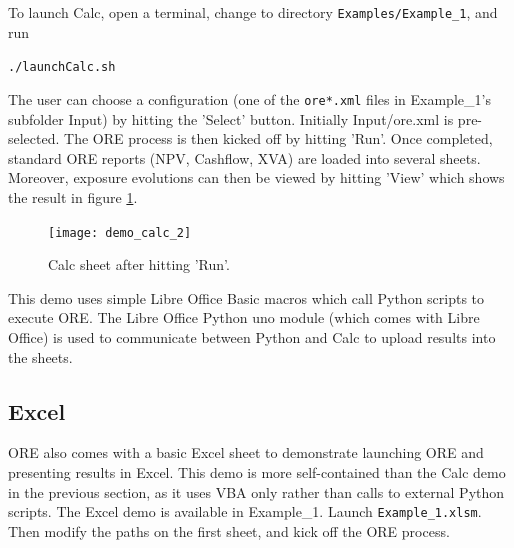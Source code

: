 \documentclass[12pt, a4paper]{article}
\begin{document}
To launch Calc, open a terminal, change to directory {\tt Examples/Example\_1}, and run

\medskip
{\centerline{\tt ./launchCalc.sh} }
\medskip

The user can choose a configuration (one of the {\tt ore*.xml} files in Example\_1's subfolder Input) by hitting the
'Select' button. Initially Input/ore.xml is pre-selected. The ORE process is then kicked off by hitting 'Run'. Once
completed, standard ORE reports (NPV, Cashflow, XVA) are loaded into several sheets. Moreover, exposure evolutions can
then be viewed by hitting 'View' which shows the result in figure \ref{fig_16}.  \\
\begin{figure}[h]
\begin{center}
\texttt{[image: demo\_calc\_2]}
\end{center}
\caption{Calc sheet after hitting 'Run'.}
\label{fig_16}
\end{figure}

This demo uses simple Libre Office Basic macros which call Python scripts to execute ORE. The Libre Office Python uno
module (which comes with Libre Office) is used to communicate between Python and Calc to upload results into the sheets.


\subsection{Excel}\label{sec:excel}

ORE also comes with a basic Excel sheet to demonstrate launching ORE and presenting results in Excel. This demo is more
self-contained than the Calc demo in the previous section, as it uses VBA only rather than calls to external Python
scripts. The Excel demo is available in Example\_1. Launch {\tt Example\_1.xlsm}. Then modify the paths on the first
sheet, and kick off the ORE process.

\end{document}
